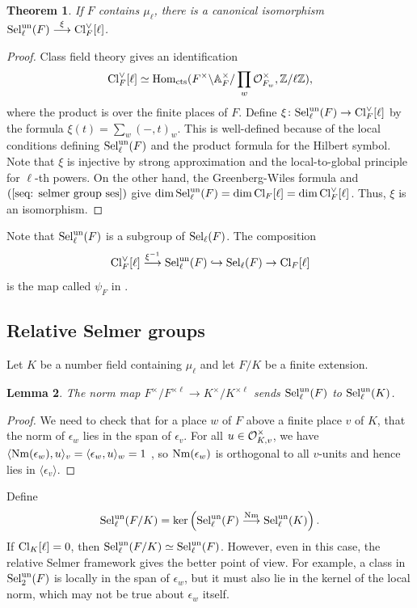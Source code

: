 \documentclass[11pt,a4paper]{amsart}
\def\Z{{\rm \mathbb{Z}}}
\def\O{{\rm \mathcal{O}}}
\def\A{{\rm \mathbb{A}}}
\def\Nm{{\rm Nm}}
\def\un{{\rm un}}
\def\Cl{{\rm Cl}}
\def\Hom{{\rm Hom}}
\def\Sel{{\rm Sel}}
\numberwithin{equation}{section}
\newtheorem{theorem}{Theorem}[section]
\newtheorem{lemma}[theorem]{Lemma}
\begin{document}
\begin{theorem}\label{thm: canonical isomorphism}
If $F$ contains $\mu_\ell$, there is a canonical isomorphism $\Sel_\ell^\un(F) \stackrel{\xi}{\longrightarrow} \Cl_F^\vee[\ell]$. 
\end{theorem}
\begin{proof}
Class field theory gives an identification 
\[\Cl_F^\vee[\ell] \simeq \Hom_{\mathrm{cts}}(F^\times\backslash\A_F^\times/\prod_w \O_{F_w}^\times, \Z/\ell\Z),\] where the product is over the finite places of $F$. 
Define $\xi \colon \Sel_\ell^\un(F) \to \Cl_F^\vee[\ell]$ by the formula $\xi(t) = \sum_w ( - ,  t )_w$. This is well-defined because of the local conditions defining $\Sel_\ell^\un(F)$ and the product formula for the Hilbert symbol.  Note that $\xi$ is injective by strong approximation and the local-to-global principle for $\ell$-th powers. On the other hand, the Greenberg-Wiles formula \cite[Theorem 8.7.9]{NeukirchSchmidtWingberg} and $(\ref{seq: selmer group ses})$ give $\dim \Sel_\ell^\un(F) = \dim \Cl_F[\ell]=\dim \Cl_F^\vee[\ell]$. Thus, $\xi$ is an isomorphism. 
\end{proof}

Note that $\Sel_\ell^\un(F)$ is a subgroup of $\Sel_\ell(F)$. The composition 
\begin{equation}\label{eq: LST map}
    \Cl_F^\vee[\ell] \stackrel{\xi^{-1}}{\longrightarrow} \Sel_\ell^\un(F) \hookrightarrow \Sel_\ell(F) \to \Cl_F[\ell]
\end{equation}
is the map called $\psi_F$ in \cite{LipnowskiSawinTsimerman}. 



\subsection{Relative Selmer groups}\label{subsec: relative signature groups}
Let $K$ be a number field containing $\mu_\ell$ and let $F/K$ be a finite extension.
\begin{lemma}
    The norm map $F^\times/F^{\times \ell} \to K^\times/K^{\times \ell}$ sends $\Sel_\ell^\un(F)$ to $\Sel_\ell^\un(K)$.  
\end{lemma} 
\begin{proof}
    We need to check that for a place $w$ of $F$ above a finite place $v$ of $K$, that the norm of $\epsilon_w$ lies in the span of $\epsilon_v$. For all $u \in \O_{K,v}^\times$, we have $\langle \Nm(\epsilon_w), u \rangle_v = \langle \epsilon_w, u\rangle_w = 1$ \cite[pg. 209]{Serre1979}, so $\Nm(\epsilon_w)$ is orthogonal to all $v$-units and hence lies in $\langle \epsilon_v \rangle$.
\end{proof}
Define 
\[\Sel_\ell^\un(F/K) = \ker\left(\Sel_\ell^\un(F) \stackrel{\Nm}{\longrightarrow} \Sel_\ell^\un(K)\right).\]
If $\Cl_K[\ell] = 0$, then $\Sel_\ell^\un(F/K) \simeq \Sel_\ell^\un(F)$. However, even in this case, the relative Selmer framework gives the better point of view. For example, a class in $\Sel_2^\un(F)$ is locally in the span of $\epsilon_w$, but it must also lie in the kernel of the local norm, which may not be true about $\epsilon_w$ itself. 
\end{document}
